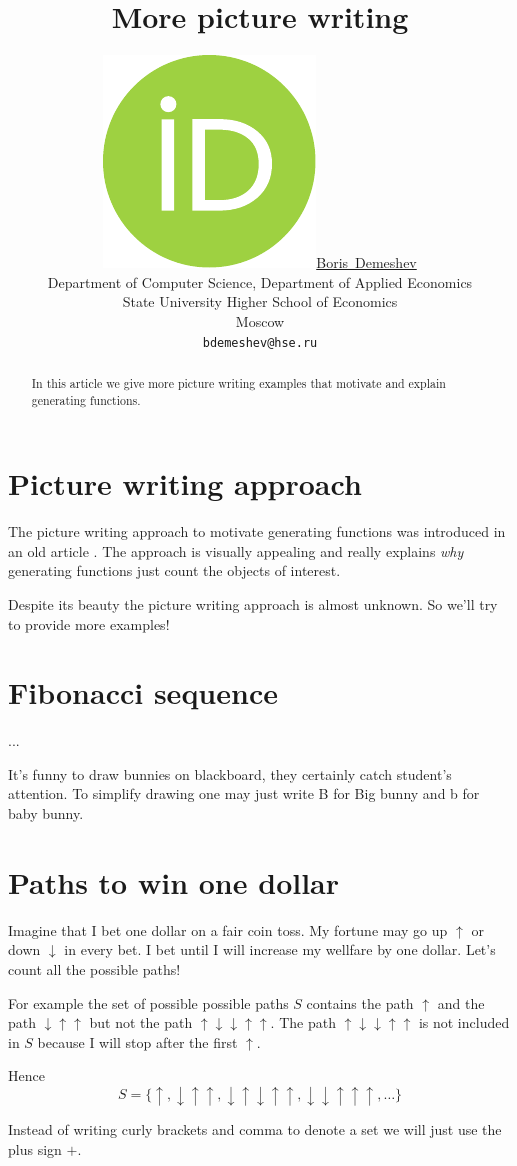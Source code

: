 \documentclass{article}
\title{More picture writing}
\author{ \href{https://orcid.org/0000-0003-2284-3204}{\includegraphics[scale=0.06]{orcid.pdf}\hspace{1mm}Boris~Demeshev}\\ %
	Department of Computer Science, Department of Applied Economics\\
	State University Higher School of Economics\\
	Moscow \\
	\texttt{bdemeshev@hse.ru} \\
}
\newcommand{\up}{\uparrow}
\newcommand{\down}{\downarrow}
\begin{document}
\maketitle

\begin{abstract}
	In this article we give more picture writing examples that motivate and explain generating functions. 
\end{abstract}


\section{Picture writing approach}

The picture writing approach to motivate generating functions was introduced in an old article \cite{polya1956picture}.
The approach is visually appealing and really explains \textit{why} generating functions just count the objects of interest.

Despite its beauty the picture writing approach is almost unknown. So we'll try to provide more examples!


\section{Fibonacci sequence}


...

It's funny to draw bunnies on blackboard, they certainly catch student's attention. 
To simplify drawing one may just write B for Big bunny and b for baby bunny. 


\section{Paths to win one dollar}

Imagine that I bet one dollar on a fair coin toss. My fortune may go up $\up$ or down $\down$ in every bet.
I bet until I will increase my wellfare by one dollar. Let's count all the possible paths!

For example the set of possible possible paths $S$ contains the path $\up$ and the path $\down\up\up$ but not the path $\up\down\down\up\up$. 
The path $\up\down\down\up\up$ is not included in $S$ because I will stop after the first $\up$. 

Hence
\[
S = \{ \up, \down\up\up, \down\up\down\up\up, \down\down\up\up\up, \ldots \}	
\]

Instead of writing curly brackets and comma to denote a set we will just use the plus sign $+$.
\end{document}

